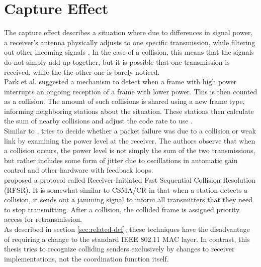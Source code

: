 
\section{Capture Effect}\label{sec:related-capture}

The capture effect describes a situation where due to differences in signal power, a receiver's antenna physically adjusts to one specific transmission, while filtering out other incoming signals \cite{kim1999}. In the case of a collision, this means that the signals do not simply add up together, but it is possible that one transmission is received, while the the other one is barely noticed.\\

Park et al. suggested a mechanism to detect when a frame with high power interrupts an ongoing reception of a frame with lower power. This is then counted as a collision. The amount of such collisions is shared using a new frame type, informing neighboring stations about the situation. These stations then calculate the sum of nearby collisions and adjust the code rate to use \cite{park2009}.\\

Similar to \cite{zhu2016}, \cite{chua2016} tries to decide whether a packet failure was due to a collision or weak link by examining the power level at the receiver. The authors observe that when a collision occurs, the power level is not simply the sum of the two transmissions, but rather includes some form of jitter due to oscillations in automatic gain control and other hardware with feedback loops.\\

\cite{jibukumar2015} proposed a protocol called Receiver-Initiated Fast Sequential Collision Resolution (RFSR). It is somewhat similar to CSMA/CR \cite{choi2013} in that when a station detects a collision, it sends out a jamming signal to inform all transmitters that they need to stop transmitting. After a collision, the collided frame is assigned priority access for retransmission.\\

As described in section \ref{sec:related-dcf}, these techniques have the disadvantage of requiring a change to the standard IEEE 802.11 MAC layer. In contrast, this thesis tries to recognize colliding senders exclusively by changes to receiver implementations, not the coordination function itself.
